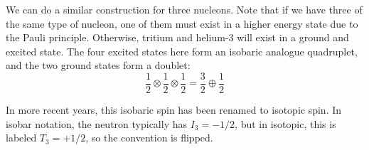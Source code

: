 \documentclass[a4paper,twoside,master.tex]{subfiles}
\begin{document}
We can do a similar construction for three nucleons. Note that if we have three of the same type of nucleon, one of them must exist in a higher energy state due to the Pauli principle. Otherwise, tritium and helium-3 will exist in a ground and excited state. The four excited states here form an isobaric analogue quadruplet, and the two ground states form a doublet:
\begin{equation}
    \frac{1}{2} \otimes \frac{1}{2} \otimes \frac{1}{2} = \frac{3}{2} \oplus \frac{1}{2}
\end{equation}

In more recent years, this isobaric spin has been renamed to isotopic spin. In isobar notation, the neutron typically has $ I_3 = - 1/2 $, but in isotopic, this is labeled $ T_3 = +1/2 $, so the convention is flipped.
\end{document}
